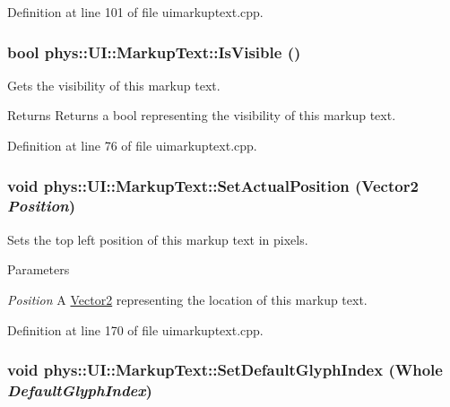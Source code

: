 Definition at line 101 of file uimarkuptext.cpp.

\hypertarget{classphys_1_1UI_1_1MarkupText_a17873359c7387926c7e759665ad4312d}{
\subsubsection[{IsVisible}]{\setlength{\rightskip}{0pt plus 5cm}bool phys::UI::MarkupText::IsVisible ()}}
\label{d7/d23/classphys_1_1UI_1_1MarkupText_a17873359c7387926c7e759665ad4312d}


Gets the visibility of this markup text. 

\begin{DoxyReturn}{Returns}
Returns a bool representing the visibility of this markup text. 
\end{DoxyReturn}


Definition at line 76 of file uimarkuptext.cpp.

\hypertarget{classphys_1_1UI_1_1MarkupText_a95ce98aec4946447e5da951911bfe628}{
\subsubsection[{SetActualPosition}]{\setlength{\rightskip}{0pt plus 5cm}void phys::UI::MarkupText::SetActualPosition ({\bf Vector2} {\em Position})}}
\label{d7/d23/classphys_1_1UI_1_1MarkupText_a95ce98aec4946447e5da951911bfe628}


Sets the top left position of this markup text in pixels. 


\begin{DoxyParams}{Parameters}
\item[{\em Position}]A \hyperlink{classphys_1_1Vector2}{Vector2} representing the location of this markup text. \end{DoxyParams}


Definition at line 170 of file uimarkuptext.cpp.

\hypertarget{classphys_1_1UI_1_1MarkupText_a6e12c59a15a110b74e8cf725cac82a29}{
\subsubsection[{SetDefaultGlyphIndex}]{\setlength{\rightskip}{0pt plus 5cm}void phys::UI::MarkupText::SetDefaultGlyphIndex ({\bf Whole} {\em DefaultGlyphIndex})}}
\label{d7/d23/classphys_1_1UI_1_1MarkupText_a6e12c59a15a110b74e8cf725cac82a29}


